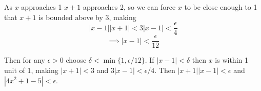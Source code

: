 \documentclass{article}
\begin{document}
As $x$ approaches 1 $x + 1$ approaches 2, so we can force $x$ to be close enough to 1 that $x + 1$ is bounded above by 3, making
$$|x - 1||x + 1| < 3|x - 1| < \frac{\epsilon}{4}$$
$$\implies |x - 1| < \frac{\epsilon}{12}$$

Then for any $\epsilon > 0$ choose $\delta < \min\{1, \epsilon/12\}$. If $|x - 1| < \delta$ then $x$ is within 1 unit of 1, making $|x + 1| < 3$ and $3|x - 1| < \epsilon/4$. Then $|x + 1||x - 1| < \epsilon$ and $|4x^2 + 1 - 5| < \epsilon$.
\end{document}
